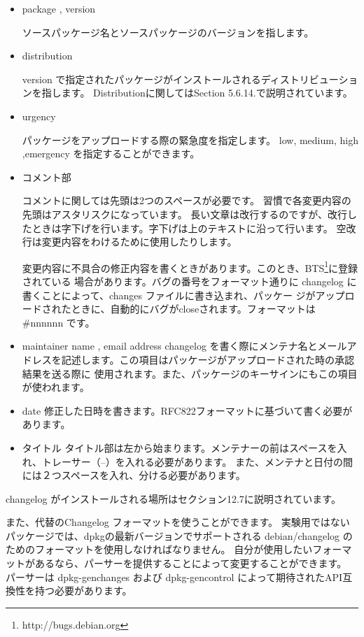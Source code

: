 \documentclass[mingoth,a4paper]{jsarticle}
\begin{document}
\begin{itemize}
\item package , version

 ソースパッケージ名とソースパッケージのバージョンを指します。
\item distribution
 
 version で指定されたパッケージがインストールされるディストリビューションを指します。
 Distributionに関してはSection 5.6.14.で説明されています。
\item urgency

 パッケージをアップロードする際の緊急度を指定します。
 low, medium, high ,emergency を指定することができます。
\item コメント部

 コメントに関しては先頭は2つのスペースが必要です。
 習慣で各変更内容の先頭はアスタリスクになっています。
 長い文章は改行するのですが、改行したときは字下げを行います。字下げは上のテキストに沿って行います。
 空改行は変更内容をわけるために使用したりします。

 変更内容に不具合の修正内容を書くときがあります。このとき、BTS\footnote{http://bugs.debian.org}に登録されている
 場合があります。バグの番号をフォーマット通りに changelog に書くことによって、changes ファイルに書き込まれ、パッケー
 ジがアップロードされたときに、自動的にバグがcloseされます。フォーマットは \#nnnnnn です。

\item maintainer name , email address
 changelog を書く際にメンテナ名とメールアドレスを記述します。この項目はパッケージがアップロードされた時の承認結果を送る際に
 使用されます。また、パッケージのキーサインにもこの項目が使われます。

\item date
 修正した日時を書きます。RFC822フォーマットに基づいて書く必要があります。


\item タイトル
 タイトル部は左から始まります。メンテナーの前はスペースを入れ、トレーサー（--）を入れる必要があります。
 また、メンテナと日付の間には２つスペースを入れ、分ける必要があります。

\end{itemize}
 changelog がインストールされる場所はセクション12.7に説明されています。

 また、代替のChangelog フォーマットを使うことができます。
 実験用ではないパッケージでは、dpkgの最新バージョンでサポートされる debian/changelog のためのフォーマットを使用しなければなりません。
 自分が使用したいフォーマットがあるなら、パーサーを提供することによって変更することができます。
 パーサーは dpkg-genchanges および dpkg-gencontrol によって期待されたAPI互換性を持つ必要があります。
\end{document}
